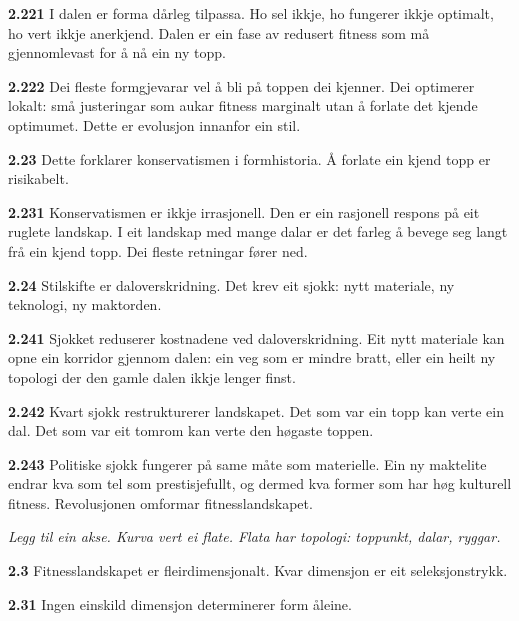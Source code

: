 \documentclass[11pt, a4paper]{article}
\newcommand{\subprop}[1]{\medskip\noindent\textbf{#1}\quad}
\begin{document}
\subprop{2.221} I dalen er forma d\aa rleg tilpassa. Ho sel ikkje, ho fungerer ikkje optimalt, ho vert ikkje anerkjend. Dalen er ein fase av redusert fitness som m\aa{} gjennomlevast for \aa{} n\aa{} ein ny topp.

\subprop{2.222} Dei fleste formgjevarar vel \aa{} bli p\aa{} toppen dei kjenner. Dei optimerer lokalt: sm\aa{} justeringar som aukar fitness marginalt utan \aa{} forlate det kjende optimumet. Dette er evolusjon innanfor ein stil.

\subprop{2.23} Dette forklarer konservatismen i formhistoria. \AA{} forlate ein kjend topp er risikabelt.

\subprop{2.231} Konservatismen er ikkje irrasjonell. Den er ein rasjonell respons p\aa{} eit ruglete landskap. I eit landskap med mange dalar er det farleg \aa{} bevege seg langt fr\aa{} ein kjend topp. Dei fleste retningar f\o rer ned.

\subprop{2.24} Stilskifte er daloverskridning. Det krev eit sjokk: nytt materiale, ny teknologi, ny maktorden.

\subprop{2.241} Sjokket reduserer kostnadene ved daloverskridning. Eit nytt materiale kan opne ein korridor gjennom dalen: ein veg som er mindre bratt, eller ein heilt ny topologi der den gamle dalen ikkje lenger finst.

\subprop{2.242} Kvart sjokk restrukturerer landskapet. Det som var ein topp kan verte ein dal. Det som var eit tomrom kan verte den h\o gaste toppen.

\subprop{2.243} Politiske sjokk fungerer p\aa{} same m\aa te som materielle. Ein ny maktelite endrar kva som tel som prestisjefullt, og dermed kva former som har h\o g kulturell fitness. Revolusjonen omformar fitnesslandskapet.



\vspace{1.5em}
\begin{center}
\emph{Legg til ein akse. Kurva vert ei flate. Flata har topologi: toppunkt, dalar, ryggar.}
\end{center}
\vspace{1.5em}


\subprop{2.3} Fitnesslandskapet er fleirdimensjonalt. Kvar dimensjon er eit seleksjonstrykk.

\subprop{2.31} Ingen einskild dimensjon determinerer form \aa leine.
\end{document}
